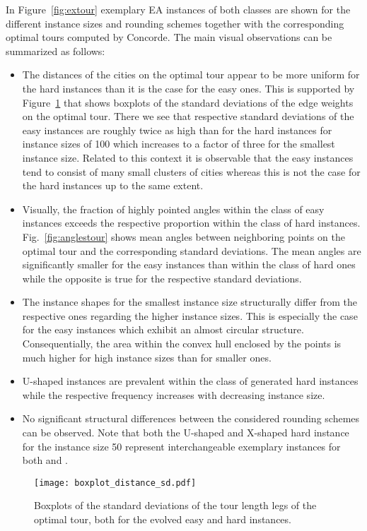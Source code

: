 \documentclass{article}
\begin{document}
In Figure~\ref{fig:extour} exemplary EA instances of both classes are
shown for the different instance sizes and rounding schemes together
with the corresponding optimal tours computed by Concorde. The main
visual observations can be summarized as follows:
\begin{itemize}
\item The distances of the cities on the optimal tour appear to be
  more uniform for the hard instances than it is the case for the easy
  ones. This is supported by Figure~\ref{fig:sdtour} that shows
  boxplots of the standard deviations of the edge weights on the
  optimal tour. There we see that respective standard deviations of
  the easy instances are roughly twice as high than for the hard
  instances for instance sizes of 100 which increases to a factor of
  three for the smallest instance size. Related to this context it is
  observable that the easy instances tend to consist of many small
  clusters of cities whereas this is not the case for the hard
  instances up to the same extent.
\item Visually, the fraction of highly pointed angles within the class
  of easy instances exceeds the respective proportion within the class
  of hard instances. Fig.~\ref{fig:anglestour} shows mean angles
  between neighboring points on the optimal tour and the corresponding
  standard deviations. The mean angles are significantly smaller for
  the easy instances than within the class of hard ones while the
  opposite is true for the respective standard deviations.
\item The instance shapes for the smallest instance size structurally
  differ from the respective ones regarding the higher instance
  sizes. This is especially the case for the easy instances which
  exhibit an almost circular structure. Consequentially, the area
  within the convex hull enclosed by the points is much higher for high instance sizes than for smaller ones.
\item U-shaped instances are prevalent within the class of generated
  hard instances while the respective frequency increases with
  decreasing instance size.
\item No significant structural differences between the considered
  rounding schemes can be observed. Note that both the U-shaped and
  X-shaped hard instance for the instance size 50 represent
  interchangeable exemplary instances for both  and .
\end{itemize}

\begin{figure}
  \centering
\texttt{[image: boxplot\_distance\_sd.pdf]}
\caption{Boxplots of the standard deviations of the tour length legs
    of the optimal tour, both for the evolved easy and hard
    instances.}
  \label{fig:sdtour}
\end{figure}
\end{document}
